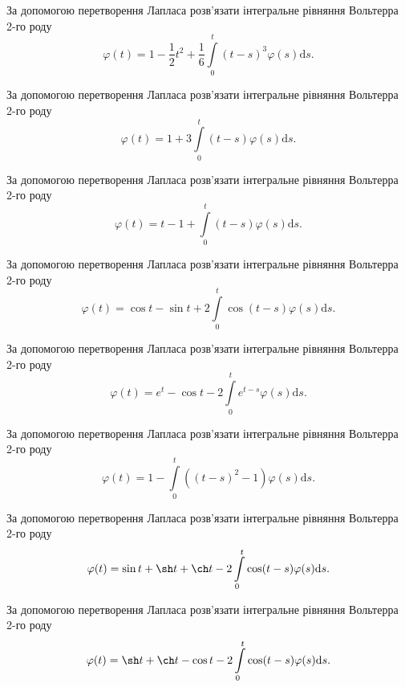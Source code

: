 \documentclass[12pt]{extarticle}
\begin{document}
\begin{Exercise}
За допомогою перетворення Лапласа розв’язати інтегральне рівняння Вольтерра 2-го роду \[\varphi(t) =  1- \dfrac{1}{2} t^2 + \dfrac{1}{6} \int\limits_{0}^{t} (t - s)^3 \varphi(s) \mathrm{d}s.\]
\end{Exercise}

\begin{Exercise}
За допомогою перетворення Лапласа розв’язати інтегральне рівняння Вольтерра 2-го роду \[\varphi(t) = 1 + 3 \int\limits_{0}^{t} (t - s) \varphi(s) \mathrm{d}s.\]
\end{Exercise}

\begin{Exercise}
За допомогою перетворення Лапласа розв’язати інтегральне рівняння Вольтерра 2-го роду \[\varphi(t) = t - 1 + \int\limits_{0}^{t} (t - s) \varphi(s) \mathrm{d}s.\]
\end{Exercise}

\begin{Exercise}
За допомогою перетворення Лапласа розв’язати інтегральне рівняння Вольтерра 2-го роду \[\varphi(t) = \cos t - \sin t + 2 \int\limits_{0}^{t} \cos (t - s) \varphi(s) \mathrm{d}s.\]
\end{Exercise}

\begin{Exercise}
За допомогою перетворення Лапласа розв’язати інтегральне рівняння Вольтерра 2-го роду \[\varphi(t) = e^t - \cos t - 2\int\limits_{0}^{t} e^{t-s} \varphi(s) \mathrm{d}s.\]
\end{Exercise}

\begin{Exercise}
За допомогою перетворення Лапласа розв’язати інтегральне рівняння Вольтерра 2-го роду \[\varphi(t) = 1 - \int\limits_{0}^{t} \left((t-s)^2 - 1\right) \varphi(s) \mathrm{d}s.\]
\end{Exercise}

\begin{Exercise}
За допомогою перетворення Лапласа розв’язати інтегральне рівняння Вольтерра 2-го роду \[\varphi(t) = \sin t + \sh t + \ch t - 2\int\limits_{0}^{t} \cos (t-s) \varphi(s) \mathrm{d}s.\]
\end{Exercise}

\begin{Exercise}
За допомогою перетворення Лапласа розв’язати інтегральне рівняння Вольтерра 2-го роду \[\varphi(t) = \sh t + \ch t - \cos t - 2\int\limits_{0}^{t} \cos (t-s) \varphi(s) \mathrm{d}s.\]
\end{Exercise}
\end{document}
